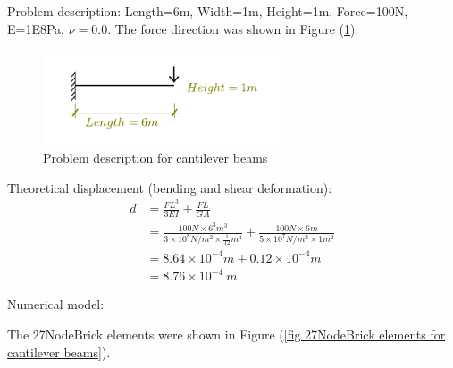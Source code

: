\documentclass[fleqn,11pt,letter]{article}
\begin{document}




Problem description: Length=6m, Width=1m, Height=1m, Force=100N, E=1E8Pa, $\nu=0.0$. The force direction was shown in Figure (\ref{fig Problem description for cantilever 27}). 

\begin{figure}[H]
  \centering
  \includegraphics[width=7cm]{../Figure_files/27NodeBrick/cantilever_6.pdf}
  \caption{Problem description for cantilever beams}
  \label{fig Problem description for cantilever 27}
\end{figure}


Theoretical displacement (bending and shear deformation):
\begin{equation}
  \begin{aligned}
  d &=\frac{FL^3}{3EI}+\frac{FL}{GA} \\ 
    &= \frac{100 N \times 6^3 m^3}{3\times 10^8 N/m^2 \times \frac{1}{12} m^4}+ 
    \frac{100 N\times 6 m}{5\times 10^7 N/m^2\times 1 m^2} \\ 
    &=8.64\times 10^{-4} m + 0.12 \times 10^{-4} m  \\
   & =8.76\times 10^{-4} \ m
   \end{aligned}
\end{equation}



Numerical model:

The 27NodeBrick elements were shown in Figure (\ref{fig 27NodeBrick elements for cantilever beams}).
\end{document}
